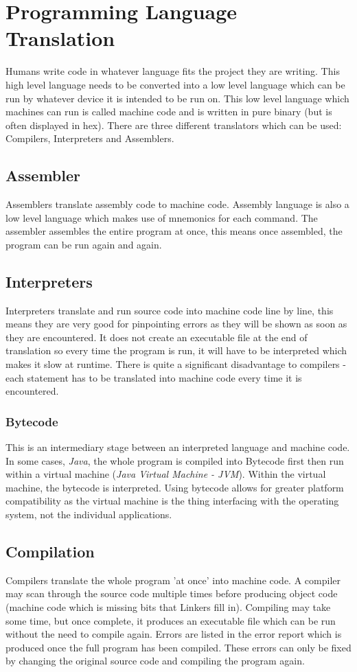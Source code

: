\documentclass[a4paper,11pt, twocolumn]{article}
\begin{document}
\section{Programming Language Translation}
Humans write code in whatever language fits the project they are writing. This high level language needs to be converted into a low level language which can be run by whatever device it is intended to be run on. This low level language which machines can run is called machine code and is written in pure binary (but is often displayed in hex). There are three different translators which can be used: Compilers, Interpreters and Assemblers.
\subsection{Assembler}
Assemblers translate assembly code to machine code. Assembly language is also a low level language which makes use of mnemonics for each command. The assembler assembles the entire program at once, this means once assembled, the program can be run again and again.
\subsection{Interpreters}
Interpreters translate and run source code into machine code line by line, this means they are very good for pinpointing errors as they will be shown as soon as they are encountered. It does not create an executable file at the end of translation so every time the program is run, it will have to be interpreted which makes it slow at runtime. There is quite a significant disadvantage to compilers - each statement has to be translated into machine code every time it is encountered. 
\subsubsection{Bytecode}
This is an intermediary stage between an interpreted language and machine code. In some cases, \textit{Java}, the whole program is compiled into Bytecode first then run within a virtual machine (\textit{Java Virtual Machine - JVM}). Within the virtual machine, the bytecode is interpreted. Using bytecode allows for greater platform compatibility as the virtual machine is the thing interfacing with the operating system, not the individual applications.
\subsection{Compilation}
Compilers translate the whole program 'at once' into machine code. A compiler may scan through the source code multiple times before producing object code (machine code which is missing bits that Linkers fill in). Compiling may take some time, but once complete, it produces an executable file which can be run without the need to compile again. Errors are listed in the error report which is produced once the full program has been compiled. These errors can only be fixed by changing the original source code and compiling the program again.
\end{document}
